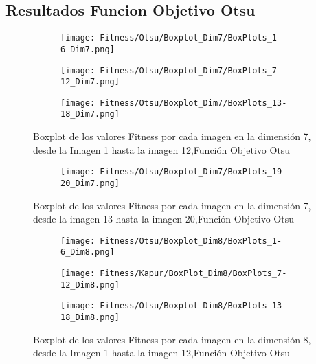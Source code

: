 \documentclass[conference]{IEEEtran}
\begin{document}
\subsection{Resultados Funcion Objetivo Otsu}
\begin{figure}
    \centering

    \begin{subfigure}{0.5\textwidth}
        \texttt{[image: Fitness/Otsu/Boxplot\_Dim7/BoxPlots\_1-6\_Dim7.png]}
    \end{subfigure}
    
    \begin{subfigure}{0.5\textwidth}
        \texttt{[image: Fitness/Otsu/Boxplot\_Dim7/BoxPlots\_7-12\_Dim7.png]}
    \end{subfigure}
         \begin{subfigure}{0.5\textwidth}
        \texttt{[image: Fitness/Otsu/Boxplot\_Dim7/BoxPlots\_13-18\_Dim7.png]}
    \end{subfigure}
    \caption{Boxplot de los valores Fitness por cada imagen en la dimensión 7, desde la Imagen 1 hasta la imagen 12,Función Objetivo Otsu}
\label{fig:imagenes}    
\end{figure}

\begin{figure}
    \centering
    \begin{subfigure}{0.5\textwidth}
        \texttt{[image: Fitness/Otsu/Boxplot\_Dim7/BoxPlots\_19-20\_Dim7.png]}
        \vspace{-150pt} %
    \end{subfigure}
    \caption{Boxplot de los valores Fitness por cada imagen en la dimensión 7, desde la imagen 13 hasta la imagen 20,Función Objetivo Otsu}
    \label{fig:imagenes}    
\end{figure}

\begin{figure}
    \centering

    \begin{subfigure}{0.5\textwidth}
        \texttt{[image: Fitness/Otsu/Boxplot\_Dim8/BoxPlots\_1-6\_Dim8.png]}
    \end{subfigure}
    
    \begin{subfigure}{0.5\textwidth}
        \texttt{[image: Fitness/Kapur/BoxPlot\_Dim8/BoxPlots\_7-12\_Dim8.png]}
    \end{subfigure}
         \begin{subfigure}{0.5\textwidth}
        \texttt{[image: Fitness/Otsu/Boxplot\_Dim8/BoxPlots\_13-18\_Dim8.png]}
    \end{subfigure}
    \caption{Boxplot de los valores Fitness por cada imagen en la dimensión 8, desde la Imagen 1 hasta la imagen 12,Función Objetivo Otsu}
\label{fig:imagenes}    
\end{figure}
\end{document}
